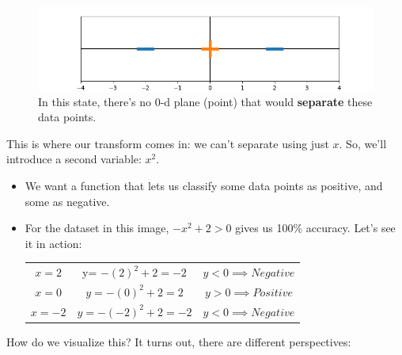         \begin{figure}[H]
            \centering
            \includegraphics[width=120mm,scale=0.5]{images/feature_images/inseparable.png}
            \caption{In this state, there's no 0-d plane (point) that would \textbf{separate} these data points.}
        \end{figure}

        This is where our transform comes in: we can't separate using just $x$. So, we'll introduce a second variable: $x^2$.

        \begin{itemize}
            \item We want a function that lets us classify some data points as positive, and some as negative.
            \item For the dataset in this image, $-x^2+2>0$ gives us 100\% accuracy. Let's see it in action:
                

            \begin{center}
                    \begin{tabular}{c || c || c}
                    $x=2$ & y= $-(2)^2+2 = -2$ & $y<0 \implies Negative$ \\
                    $x=0$ & $y = -(0)^2+2 = 2$ & $y>0 \implies Positive$ \\
                    $x=-2$ & $y= -(-2)^2+2 = -2$ & $y<0 \implies Negative$ \\
                    \end{tabular}
                \end{center}
                
        \end{itemize}

        How do we visualize this? It turns out, there are different perspectives:\\

